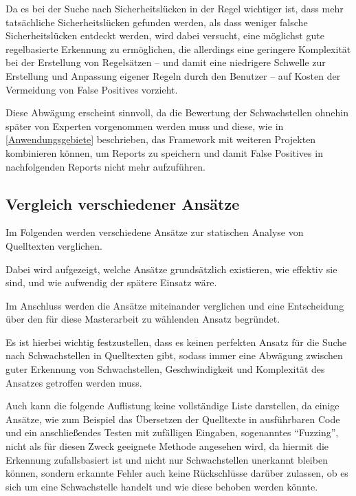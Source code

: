             Da es bei der Suche nach Sicherheitslücken in der Regel wichtiger ist,
            dass mehr tatsächliche Sicherheitslücken gefunden werden,
            als dass weniger falsche Sicherheitslücken entdeckt werden,
            wird dabei versucht,
            eine möglichst gute regelbasierte Erkennung zu ermöglichen,
            die allerdings eine geringere Komplexität bei der Erstellung von Regelsätzen
            -- und
            damit eine niedrigere Schwelle zur Erstellung und
            Anpassung eigener Regeln durch den Benutzer
            -- auf Kosten der Vermeidung von False Positives vorzieht.

            Diese Abwägung erscheint sinnvoll,
            da die Bewertung der Schwachstellen ohnehin später von Experten vorgenommen werden muss und
            diese,
            wie in
            \vref{Anwendungsgebiete} beschrieben,
            das Framework mit weiteren Projekten kombinieren können,
            um Reports zu speichern und
            damit False Positives in nachfolgenden Reports nicht mehr aufzuführen.

        \subsection{Vergleich verschiedener Ansätze}
            Im Folgenden werden verschiedene Ansätze zur statischen Analyse von Quelltexten verglichen.

            Dabei wird aufgezeigt,
            welche Ansätze grundsätzlich existieren,
            wie effektiv sie sind, und
            wie aufwendig der spätere Einsatz wäre.

            Im Anschluss werden die Ansätze miteinander verglichen und
            eine Entscheidung über den für diese Masterarbeit zu wählenden Ansatz begründet.

            Es ist hierbei wichtig festzustellen,
            dass es keinen perfekten Ansatz für die Suche nach Schwachstellen in Quelltexten gibt,
            sodass immer eine Abwägung zwischen guter Erkennung von Schwachstellen,
            Geschwindigkeit und
            Komplexität des Ansatzes getroffen werden muss.

            Auch kann die folgende Auflistung keine vollständige Liste darstellen,
            da einige Ansätze,
            wie zum Beispiel das Übersetzen der Quelltexte in ausführbaren Code und
            ein anschließendes Testen mit zufälligen Eingaben,
            sogenanntes
            \foreignquote{english}{Fuzzing},
            nicht als für diesen Zweck geeignete Methode angesehen wird,
            da hiermit die Erkennung zufallsbasiert ist und
            nicht nur Schwachstellen unerkannt bleiben können,
            sondern erkannte Fehler auch keine Rückschlüsse darüber zulassen,
            ob es sich um eine Schwachstelle handelt und
            wie diese behoben werden könnte.

